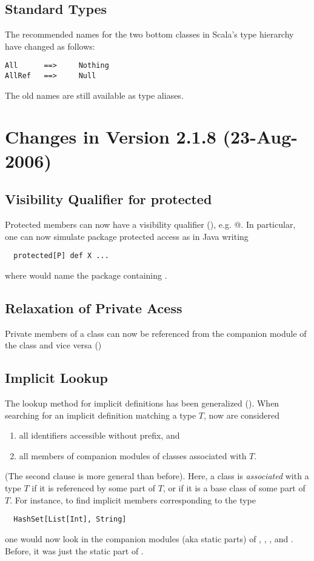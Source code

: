 \subsection*{Standard Types} 

The recommended names for the two bottom classes in Scala's type
hierarchy have changed as follows:
\begin{lstlisting}
All      ==>     Nothing
AllRef   ==>     Null
\end{lstlisting}
The old names are still available as type aliases.

\section{Changes in Version 2.1.8 (23-Aug-2006)}

\subsection*{Visibility Qualifier for protected}

Protected members can now have a visibility qualifier (),
e.g. \lstinline@protected[<qualifier>]@. In particular, one can now
simulate package protected access as in Java writing
\begin{lstlisting}
  protected[P] def X ...
\end{lstlisting}
where  would name the package containing .

\subsection*{Relaxation of Private Acess}

Private members of a class can now be referenced from the companion
module of the class and vice versa ()

\subsection*{Implicit Lookup}

The lookup method for implicit definitions has been generalized
(). 
When searching for an implicit definition matching a type $T$, now are
considered
\begin{enumerate}
\item all identifiers accessible without prefix, and
\item all members of companion modules of classes associated with $T$.
\end{enumerate}
(The second clause is more general than before). 
Here, a class is {\em associated} with a type $T$ if it is referenced
by some part of $T$, 
or if it is a base class of some part of $T$. 
For instance, to find implicit members corresponding to the type
\begin{lstlisting}
  HashSet[List[Int], String]
\end{lstlisting}
one would now look in the companion modules (aka static parts) of 
, , , and . 
Before, it was just the static part of .

